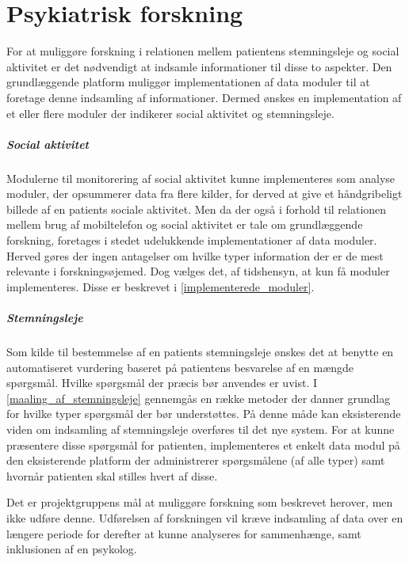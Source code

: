 \chapter{Psykiatrisk forskning}\label{problem}
For at muliggøre forskning i relationen mellem patientens stemningsleje og social aktivitet er det nødvendigt at indsamle informationer til disse to aspekter.
Den grundlæggende platform muliggør implementationen af data moduler  til at foretage denne indsamling af informationer.
Dermed ønskes en implementation af et eller flere moduler der indikerer social aktivitet og stemningsleje.

\paragraph{Social aktivitet}
Modulerne til monitorering af social aktivitet kunne implementeres som analyse moduler, der opsummerer data fra flere kilder, for derved at give et håndgribeligt billede af en patients sociale aktivitet.
Men da der også i forhold til relationen mellem brug af mobiltelefon og social aktivitet er tale om grundlæggende forskning, foretages i stedet udelukkende implementationer af data moduler.
Herved gøres der ingen antagelser om hvilke typer information der er de mest relevante i forskningsøjemed.
Dog vælges det, af tidshensyn, at kun få moduler implementeres.
Disse er beskrevet i \cref{implementerede_moduler}.

\paragraph{Stemningsleje}
Som kilde til bestemmelse af en patients stemningsleje ønskes det at benytte en automatiseret vurdering baseret på patientens besvarelse af en mængde spørgsmål.
Hvilke spørgsmål der præcis bør anvendes er uvist.
I \cref{maaling_af_stemningsleje} gennemgås en række metoder der danner grundlag for hvilke typer spørgsmål der bør understøttes.
På denne måde kan eksisterende viden om indsamling af stemningsleje overføres til det nye system.
For at kunne præsentere disse spørgsmål for patienten, implementeres et enkelt data modul på den eksisterende platform\citefaelles{} der administrerer spørgsmålene (af alle typer) samt hvornår patienten skal stilles hvert af disse.

Det er projektgruppens mål at muliggøre forskning som beskrevet herover, men ikke udføre denne.
Udførelsen af forskningen vil kræve indsamling af data over en længere periode for derefter at kunne analyseres for sammenhænge, samt inklusionen af en psykolog.

